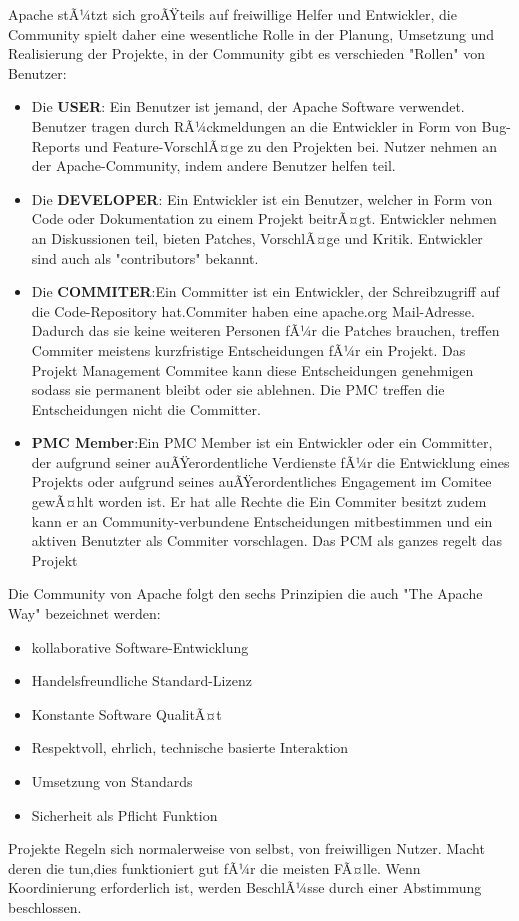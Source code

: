 Apache stÃ¼tzt sich groÃŸteils auf  freiwillige Helfer und Entwickler, die Community spielt daher eine wesentliche Rolle in der Planung, Umsetzung und Realisierung der Projekte, in der Community gibt es verschieden "Rollen" von Benutzer:
\begin{itemize}
\item{Die \textbf{USER}: Ein Benutzer ist jemand, der Apache Software verwendet. Benutzer tragen durch RÃ¼ckmeldungen an die Entwickler in Form von Bug-Reports und Feature-VorschlÃ¤ge zu den Projekten bei. Nutzer nehmen an der Apache-Community, indem andere Benutzer helfen teil.}
\item{Die \textbf{DEVELOPER}: Ein Entwickler ist ein Benutzer, welcher in Form von Code oder Dokumentation zu einem Projekt beitrÃ¤gt. Entwickler nehmen an Diskussionen teil, bieten Patches, VorschlÃ¤ge und Kritik. Entwickler sind auch als  "contributors" bekannt.}
\item{Die \textbf{COMMITER}:Ein Committer ist ein Entwickler, der Schreibzugriff auf die Code-Repository hat.Commiter haben eine apache.org Mail-Adresse. Dadurch das sie keine weiteren Personen fÃ¼r die Patches brauchen, treffen Commiter meistens kurzfristige Entscheidungen fÃ¼r ein Projekt. Das Projekt Management Commitee kann diese Entscheidungen genehmigen sodass sie permanent bleibt oder sie ablehnen. Die PMC treffen die Entscheidungen nicht die Committer.}
\item{\textbf{PMC Member}:Ein PMC Member ist ein Entwickler oder ein Committer, der aufgrund seiner auÃŸerordentliche Verdienste fÃ¼r die Entwicklung eines Projekts oder aufgrund seines auÃŸerordentliches  Engagement im Comitee gewÃ¤hlt worden ist. Er hat alle Rechte die Ein Commiter besitzt zudem kann er an Community-verbundene Entscheidungen mitbestimmen und ein aktiven Benutzter als Commiter vorschlagen. Das PCM als ganzes regelt das Projekt }
\end{itemize}
\newpage
Die Community von Apache folgt den sechs Prinzipien die auch "The Apache Way" bezeichnet werden:
\begin{itemize}
\item{kollaborative Software-Entwicklung}
\item{Handelsfreundliche Standard-Lizenz}
\item{Konstante Software QualitÃ¤t}
\item{Respektvoll, ehrlich, technische basierte Interaktion}
\item{Umsetzung von Standards}
\item{Sicherheit als Pflicht Funktion}
\end{itemize}
Projekte Regeln sich normalerweise von selbst, von freiwilligen Nutzer. Macht deren die tun,dies funktioniert gut fÃ¼r die meisten FÃ¤lle. Wenn Koordinierung erforderlich ist, werden BeschlÃ¼sse durch einer Abstimmung beschlossen.

